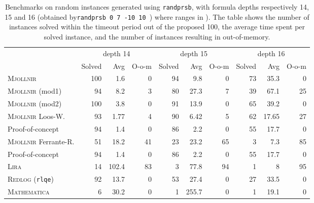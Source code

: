 \begin{table}[htb]
\begin{center}
\tableaularge
\begin{tabular}{|l|r|r|r|r|r|r|r|r|r|}
\hline
& \multicolumn{3}{|c}{depth 14}
& \multicolumn{3}{|c|}{depth 15}
& \multicolumn{3}{|c|}{depth 16}\\
& Solved & Avg & O-o-m
& Solved & Avg & O-o-m
& Solved & Avg & O-o-m\\
\hline
\textsc{Mjollnir} & 100 & 1.6 & 0 & 94 & 9.8 & 0 & 73 & 35.3 & 0\\
\textsc{Mjollnir} (mod1) & 94 & 8.2 & 3 & 80 & 27.3 & 7 & 39 & 67.1 & 25\\
\textsc{Mjollnir} (mod2) & 100 & 3.8 & 0 & 91 & 13.9 & 0 & 65 & 39.2 & 0\\
\textsc{Mjollnir} Loos-W. & 93 & 1.77 & 4 & 90 & 6.42 & 5 & 62 & 17.65 & 27\\
Proof-of-concept & 94 & 1.4 & 0 & 86 & 2.2 & 0 & 55 & 17.7 & 0\\
\textsc{Mjollnir} Ferrante-R. & 51 & 18.2 & 41 & 23 & 23.2 & 65 & 3 & 7.3 & 85\\
Proof-of-concept & 94 & 1.4 & 0 & 86 & 2.2 & 0 & 55 & 17.7 & 0\\
\textsc{Lira} & 14 & 102.4 & 83 & 3 & 77.8 & 94 & 1 & 8 & 95\\
\textsc{Redlog} (\texttt{rlqe}) & 92 & 13.7 & 0 & 53 & 27.4 & 0 & 27 & 33.5 & 0\\
\textsc{Mathematica} & 6 & 30.2 & 0 & 1 & 255.7 & 0 & 1 & 19.1 & 0\\
\hline
\end{tabular}
\end{center}
\caption{Benchmarks on  random instances generated using \texttt{randprsb}, with formula depths  respectively 14, 15 and 16 (obtained by\texttt{randprsb 0 7 -10 10  }) where  ranges in ). The table shows the number of instances solved within the timeout period out of the proposed 100, the average time spent per solved instance, and the number of instances resulting in out-of-memory.}
\label{tab:benchmarks2}
\end{table}

